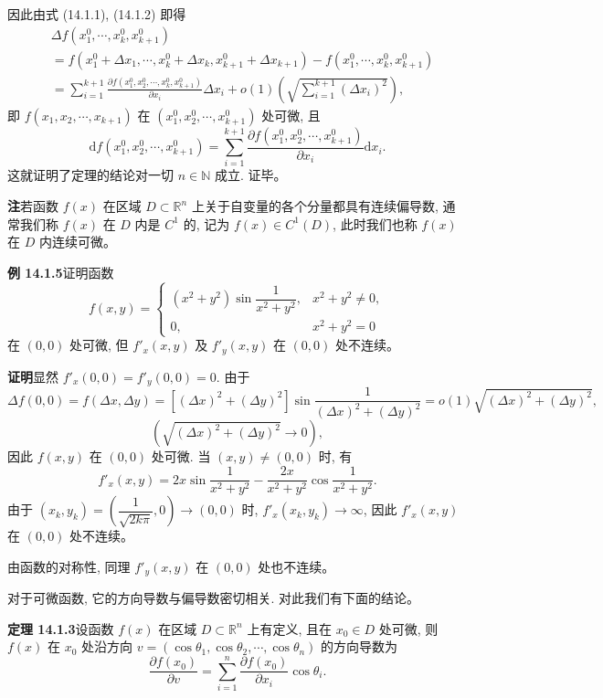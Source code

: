\documentclass[UTF8,12pt,a4paper,fontset=fandol]{ctexart}
\begin{document}
因此由式 (14.1.1), (14.1.2) 即得
\[
\begin{aligned}
&\Delta f(x_1^0,\cdots,x_k^0,x_{k+1}^0)\\
&=
  f(x_1^0+\Delta x_1,\cdots,x_k^0+\Delta x_k,x_{k+1}^0+\Delta x_{k+1})
  -f(x_1^0,\cdots,x_k^0,x_{k+1}^0)\\
&=\sum_{i=1}^{k+1}
  \frac{\partial f(x_1^0,x_2^0,\cdots,x_k^0,x_{k+1}^0)}{\partial x_i}\Delta x_i
  +o(1)\left(\sqrt{\sum_{i=1}^{k+1}(\Delta x_i)^2}\right),
\end{aligned}
\]
即 $f(x_1,x_2,\cdots,x_{k+1})$ 在 $(x_1^0,x_2^0,\cdots,x_{k+1}^0)$ 处可微, 且
\[
  \mathrm df(x_1^0,x_2^0,\cdots,x_{k+1}^0)
  =\sum_{i=1}^{k+1}
  \frac{\partial f(x_1^0,x_2^0,\cdots,x_{k+1}^0)}{\partial x_i}\mathrm dx_i.
\]
这就证明了定理的结论对一切 $n\in\mathbb N$ 成立. 证毕。

\noindent\textbf{注}\quad 若函数 $f(x)$ 在区域 $D\subset\mathbb R^n$ 上关于自变量的各个分量都具有连续偏导数, 通常我们称 $f(x)$ 在 $D$ 内是 $C^1$ 的, 记为 $f(x)\in C^1(D)$, 此时我们也称 $f(x)$ 在 $D$ 内连续可微。

\noindent\textbf{例 14.1.5}\quad 证明函数
\[
  f(x,y)=
  \begin{cases}
    (x^2+y^2)\sin\dfrac1{x^2+y^2}, & x^2+y^2\ne0,\\
    0, & x^2+y^2=0
  \end{cases}
\]
在 $(0,0)$ 处可微, 但 $f'_x(x,y)$ 及 $f'_y(x,y)$ 在 $(0,0)$ 处不连续。

\noindent\textbf{证明}\quad 显然 $f'_x(0,0)=f'_y(0,0)=0$. 由于
\[
  \Delta f(0,0)=f(\Delta x,\Delta y)
  =[(\Delta x)^2+(\Delta y)^2]\sin\frac1{(\Delta x)^2+(\Delta y)^2}
  =o(1)\sqrt{(\Delta x)^2+(\Delta y)^2},
\]
\[
  \left(\sqrt{(\Delta x)^2+(\Delta y)^2}\to0\right),
\]
因此 $f(x,y)$ 在 $(0,0)$ 处可微. 当 $(x,y)\ne(0,0)$ 时, 有
\[
  f'_x(x,y)=2x\sin\frac1{x^2+y^2}-\frac{2x}{x^2+y^2}\cos\frac1{x^2+y^2}.
\]
由于 $(x_k,y_k)=\left(\dfrac1{\sqrt{2k\pi}},0\right)\to(0,0)$ 时, $f'_x(x_k,y_k)\to\infty$, 因此 $f'_x(x,y)$ 在 $(0,0)$ 处不连续。

由函数的对称性, 同理 $f'_y(x,y)$ 在 $(0,0)$ 处也不连续。

对于可微函数, 它的方向导数与偏导数密切相关. 对此我们有下面的结论。

\noindent\textbf{定理 14.1.3}\quad 设函数 $f(x)$ 在区域 $D\subset\mathbb R^n$ 上有定义, 且在 $x_0\in D$ 处可微, 则 $f(x)$ 在 $x_0$ 处沿方向 $v=(\cos\theta_1,\cos\theta_2,\cdots,\cos\theta_n)$ 的方向导数为
\[
  \frac{\partial f(x_0)}{\partial v}
  =\sum_{i=1}^n\frac{\partial f(x_0)}{\partial x_i}\cos\theta_i.
\]
\end{document}
